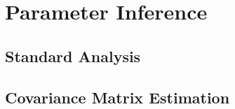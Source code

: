\chapter{Parameter Inference }

\section{Standard Analysis}

\section{Covariance Matrix Estimation} %

